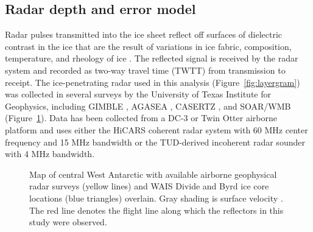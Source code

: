 \subsection{Radar depth and error model}
 Radar pulses transmitted into the ice sheet reflect off surfaces of dielectric contrast in the ice that are the result of variations in ice fabric, composition, temperature, and rheology of ice \citep{fujita2000}. The reflected signal is received by the radar system and recorded as two-way travel time (TWTT) from transmission to receipt.  The ice-penetrating radar used in this analysis (Figure~\ref{fig:layergram}) was collected in several surveys by the University of Texas Institute for Geophysics, including GIMBLE \citep{wais2016}, AGASEA \citep{holt2006}, CASERTZ \citep{morse2002}, and SOAR/WMB \citep{luyendyk2003} (Figure~\ref{fig:radarmap}). Data has been collected from a DC-3 or Twin Otter airborne platform and uses either the HiCARS coherent radar system with 60 MHz center frequency and 15 MHz bandwidth \citep{peters2005} or the TUD-derived incoherent radar sounder \citep{blankenship2001} with 4 MHz bandwidth.


\begin{figure}[h]\label{fig:radarmap}
\centering
{}
\caption{Map of central West Antarctic with available airborne geophysical radar surveys (yellow lines) and  WAIS Divide and Byrd ice core locations (blue triangles) overlain. Gray shading is surface velocity \citep{rignot2011}. The red line denotes the flight line along which the reflectors in this study were observed. }
\end{figure}


